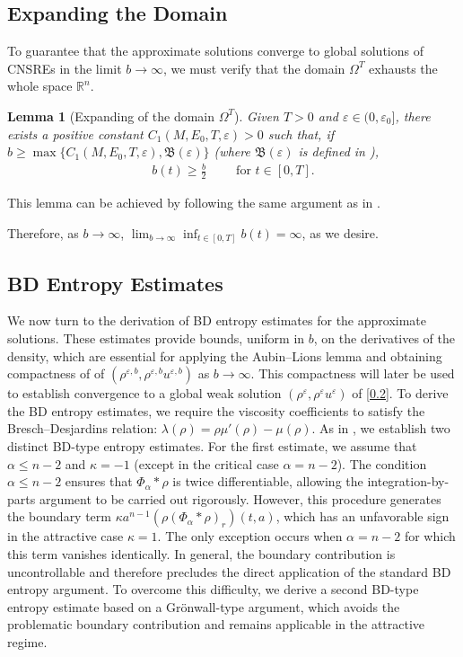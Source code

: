 \documentclass[reqno,11pt]{amsart}
\numberwithin{equation}{section}
\newtheorem{lemma}[theorem]{Lemma}
\theoremstyle{definition}
\def\v{\varepsilon}
\begin{document}
\subsection{Expanding the Domain}
To guarantee that the approximate solutions converge to global solutions of CNSREs 
in the limit $b\to \infty$, we must verify that the domain $\Omega^T$ exhausts the whole space $\mathbb{R}^n$.

\begin{lemma}[Expanding of the domain $\Omega^T$]\label{expand}
Given $T>0$ and $\v\in(0,\v_0]$, there exists a positive constant $C_1(M,E_0,T,\v)>0$ such that,
if $b\geq \max\{C_1(M,E_0,T,\v),\mathfrak{B}(\v)\}$ {\rm (}where $\mathfrak{B}(\v)$ is defined in {\rm \cite[Lemma B.8]{Carrillo2025}}{\rm )},
	\begin{align*}
	b(t)\geq \frac{b}{2}\qquad\,\, \mbox{for $t\in[0,T]$}.
	\end{align*}
\end{lemma}

This lemma can be achieved by following the same argument as in \cite[Lemma 5.5]{Chen_2024}.

Therefore, as $b \to \infty$, $\lim_{b \to \infty} \inf_{t \in [0,T]} b(t) = \infty$, as we desire.

\subsection{BD Entropy Estimates}
We now turn to the derivation of BD entropy estimates for the approximate solutions. 
These estimates provide bounds, uniform in $b$, on the derivatives of the density, 
which are essential for applying the Aubin–Lions lemma and obtaining compactness of
of $(\rho^{\v,b}, \rho^{\v,b}u^{\v,b})$ as $b \to \infty$.
This compactness will later be used to establish convergence to a global weak solution 
$(\rho^\v, \rho^\v u^\v)$ of \eqref{0.2}.
To derive the BD entropy estimates, we require the viscosity coefficients to 
satisfy the Bresch–Desjardins relation:
$\lambda(\rho) = \rho \mu'(\rho) - \mu(\rho)$. 
As in \cite{Carrillo2025}, we establish two distinct BD-type entropy estimates.
For the first estimate, we assume that $\alpha \leq n-2$ and $\kappa = -1$ (except in the critical case 
$\alpha = n-2$). The condition $\alpha \leq n-2$ ensures that $\Phi_\alpha * \rho$ 
is twice differentiable, allowing the integration-by-parts argument to be carried out rigorously. 
However, this procedure generates the boundary term
$\kappa a^{n-1} (\rho(\Phi_\alpha * \rho)_r)(t,a)$, which has an unfavorable sign in the attractive case 
$\kappa = 1$. The only exception occurs when $\alpha=n-2$
for which this term vanishes identically.  
In general, the boundary contribution is uncontrollable and therefore precludes the direct application 
of the standard BD entropy argument.
To overcome this difficulty, we derive a second BD-type entropy estimate based on a Grönwall-type argument, which avoids the problematic boundary contribution and remains applicable in the attractive regime.
\end{document}
